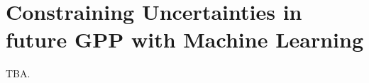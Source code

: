 


\chapter{Constraining Uncertainties in future \acl{GPP} with Machine Learning}
\label{ch:06:paper_gpp}

TBA.